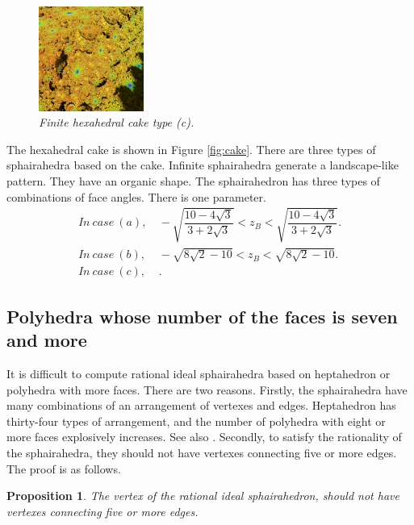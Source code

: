 \documentclass[suppldata, dvipdfmx]{interact}
\theoremstyle{plain}%
\newtheorem{proposition}[theorem]{Proposition}
\theoremstyle{definition}
\theoremstyle{remark}
\theoremstyle{problemstyle}
\begin{document}
\begin{figure}[H]
\begin{minipage}{0.5\textwidth}
  \begin{minipage}[t]{0.24\textwidth}
   \centering
   \includegraphics[width=1.35in, height=1.35in,
   keepaspectratio]{./img/sphairahedron/hexahedralCake2/limitsetInf_c.png} 
  \end{minipage}
  \hspace*{\fill}
  \caption{\textit{Finite hexahedral cake type (c).}}
  \label{}
 \end{minipage}
\end{figure}

The hexahedral cake is shown in Figure \ref{fig:cake}. There are three
types of sphairahedra based on the cake.
Infinite sphairahedra generate a landscape-like pattern.
They have an organic shape.
The sphairahedron has three types of combinations of face angles.
There is one parameter.
\begin{align*}
 In~case~(a),&~- \sqrt{\dfrac{10 - 4 \sqrt{3}}{3 + 2 \sqrt{3}}} < z_B <\sqrt{\dfrac{10 - 4 \sqrt{3}}{3 + 2 \sqrt{3}}}.\\ 
 In~case~(b),&~-\sqrt{8\sqrt{2}-10} < z_B < \sqrt{8\sqrt{2} - 10}.\\
 In~case~(c),&~.%
\end{align*}

\subsection{Polyhedra whose number of the faces is seven and more}

It is difficult to compute rational ideal sphairahedra based on
heptahedron or polyhedra with more faces.
There are two reasons.
Firstly, the sphairahedra have many combinations of an arrangement of
vertexes and edges. 
Heptahedron has thirty-four types of arrangement, and
the number of polyhedra with eight or more faces explosively
increases. See also \cite{countingPolyhedra}.
Secondly, to satisfy the rationality of the sphairahedra, they should not
have vertexes connecting five or more edges.
The proof is as follows.

\begin{proposition}
 The vertex of the rational ideal sphairahedron, should not
 have vertexes connecting five or more edges.
\end{proposition}
\end{document}
